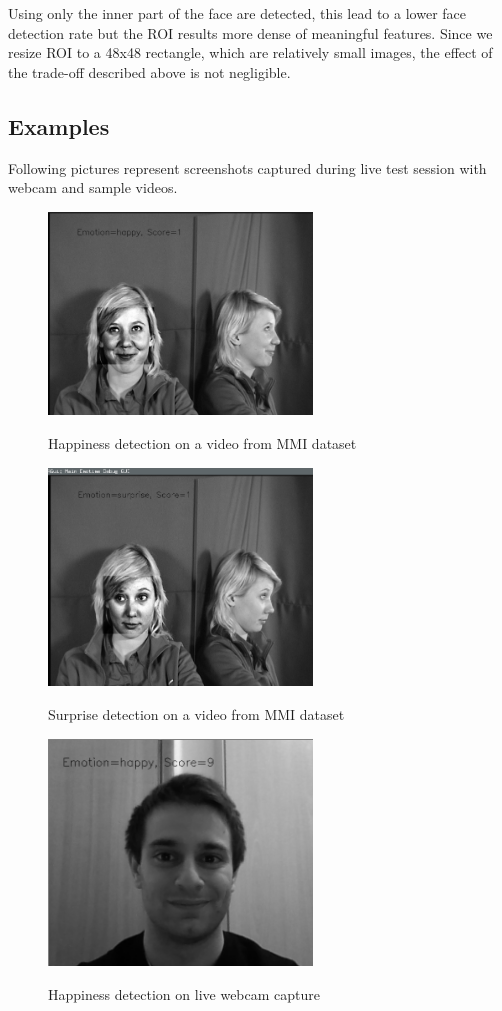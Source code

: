 Using  only the inner part of the face are detected, this lead to a lower face detection rate but the ROI results more dense of meaningful features. Since we resize ROI to a 48x48 rectangle, which are relatively small images, the effect of the trade-off described above is not negligible.

\subsection{Examples}

Following pictures represent screenshots captured during live test session with webcam and sample videos.

\begin{figure}
\centering
\includegraphics[width=7cm]{images/example_happy3.png}
\label{fig:example_happy3}
\caption{Happiness detection on a video from MMI dataset}
\end{figure}

\begin{figure}
\centering
\includegraphics[width=7cm]{images/example_surprise.png}
\label{fig:example_surprise}
\caption{Surprise detection on a video from MMI dataset}
\end{figure}

\begin{figure}
\centering
\includegraphics[width=7cm]{images/example_happy1.png}
\label{fig:example_happy1}
\caption{Happiness detection on live webcam capture}
\end{figure}

